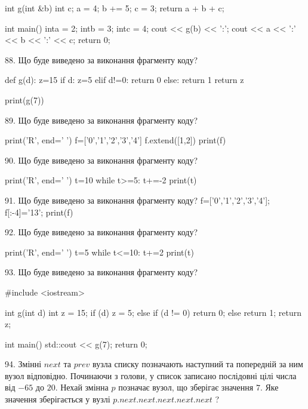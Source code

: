 \documentclass[11pt]{article}
\begin{document}
int g(int &b){
int c;    a = 4;
    b += 5;
    c = 3;
    return a + b + c;
}

int main(){
    inta = 2;
    intb = 3;
    intc = 4;
    cout << g(b) << ':';
    cout << a << ':' << b << ':' << c;
    return 0; 
}
\vspace{5mm}

88. Що буде виведено за виконання фрагменту коду?

def g(d):
    z=15
    if d: 
        z=5
    elif d!=0:
         return 0
    else:
         return 1
    return z

print(g(7))
\vspace{5mm}

89. Що буде виведено за виконання фрагменту коду?

print('R', end=' ')
f=['0','1','2','3','4']
f.extend([1,2])
print(f)

\vspace{5mm}

90. Що буде виведено за виконання фрагменту коду?

print('R', end=' ')
t=10
while t>=5:
    t+=-2
print(t)

\vspace{5mm}

91. Що буде виведено за виконання фрагменту коду?
f=['0','1','2','3','4']; f[:-4]='13'; print(f)\vspace{5mm}

92. Що буде виведено за виконання фрагменту коду?

print('R', end=' ')
t=5
while t<=10:
    t+=2
print(t)

\vspace{5mm}

93. Що буде виведено за виконання фрагменту коду?

#include <iostream>

int g(int d){
    int z = 15;
    if (d) 
        z = 5;
    else if (d != 0)
         return 0;
    else
         return 1;
    return z;
}

int main(){
    std::cout << g(7);
    return 0;
}

\vspace{5mm}

94. 
Змінні $next$ та $prev$ вузла списку позначають наступний та попередній за ним вузол відповідно. Починаючи з голови, у список записано послідовні цілі числа від $-65$ до $20$. Нехай змінна $p$ позначає вузол, що зберігає значення $7$.
Яке значення зберігається у вузлі $p.next.next.next.next.next$ ?
\vspace{5mm}
\end{document}
